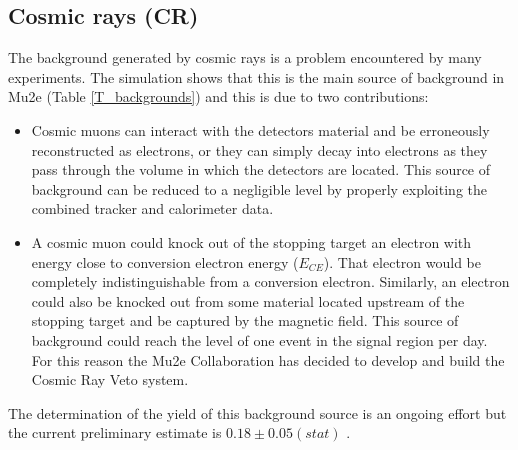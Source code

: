 \documentclass[12pt,a4paper,openright, oneside, titlepage]{book} %
\begin{document}
\subsection{Cosmic rays (CR)}
The background generated by cosmic rays is a problem encountered by many experiments.
The simulation shows that this is the main source of background in Mu2e (Table \ref{T_backgrounds}) and this is due to two contributions:

\begin{itemize}
\item Cosmic muons can interact with the detectors material and be erroneously reconstructed as electrons, or they can simply decay into electrons as they pass through the volume in which the detectors are located. 
This source of background can be reduced to a negligible level by properly exploiting the combined tracker and calorimeter data.
\item A cosmic muon could knock out of the stopping target an electron with energy close to conversion electron energy ($E_{CE}$). 
That electron would be completely indistinguishable from a conversion electron. 
Similarly, an electron could also be knocked out from some material located upstream of the stopping target and be captured by the magnetic field. 
This source of background could reach the level of one event in the signal region per day.
For this reason the Mu2e Collaboration has decided to develop and build the Cosmic Ray Veto system.
\end{itemize}
The determination of the yield of this background source is an ongoing effort but the current preliminary estimate is $0.18\pm0.05(stat)$ \cite{CRV_now}.
\end{document}
